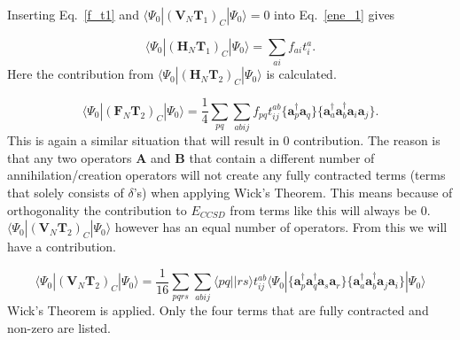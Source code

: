 \documentclass[graybox,sectrefs,envcountresetchap,open=right]{svmonodo}
\begin{document}
Inserting Eq.~\ref{f_t1} and $\langle \Psi_0 | (\mathbf{V}_N \mathbf{T}_1)_C | \Psi_0 \rangle = 0$ into Eq.~\ref{ene_1} gives 

\begin{equation}
\langle \Psi_0 | (\mathbf{H}_N \mathbf{T}_1)_C | \Psi_0 \rangle = \sum_{ai} f_{ai} t_i^a . \label{Energy_Contribution_1}
\end{equation} 
Here the contribution from $\langle \Psi_0 | (\mathbf{H}_N \mathbf{T}_2)_C | \Psi_0 \rangle$ is calculated.

\begin{equation}
\langle \Psi_0 | (\mathbf{F}_N \mathbf{T}_2)_C | \Psi_0 \rangle = \frac{1}{4} \sum_{pq} \sum_{abij} f_{pq} t_{ij}^{ab} \{ \mathbf{a}^{\dagger}_p \mathbf{a}_q \}
\{ \mathbf{a}^{\dagger}_a \mathbf{a}^{\dagger}_b \mathbf{a}_i \mathbf{a}_j \} .
\end{equation} 
This is again a similar situation that will result in 0 contribution. The reason is that any two operators $\mathbf{A}$ and $\mathbf{B}$ that contain a different number of annihilation/creation operators will not create any fully contracted terms (terms that solely consists of $\delta$'s) when applying Wick's Theorem. This means because of orthogonality the contribution to $E_{CCSD}$ from terms like this will always be 0. \\

$\langle \Psi_0 | (\mathbf{V}_N \mathbf{T}_2)_C | \Psi_0 \rangle$ however has an equal number of operators. From this we will have a contribution.

\begin{equation}
\langle \Psi_0 | (\mathbf{V}_N \mathbf{T}_2)_C | \Psi_0 \rangle = \frac{1}{16} \sum_{pqrs} \sum_{abij} \langle pq||rs \rangle t_{ij}^{ab} \langle \Psi_0|
\{
\mathbf{a}^{\dagger}_p \mathbf{a}^{\dagger}_q
\mathbf{a}_s \mathbf{a}_r \}
\{
\mathbf{a}^{\dagger}_a \mathbf{a}^{\dagger}_b
\mathbf{a}_j \mathbf{a}_i \}
| \Psi_0 \rangle \nonumber
\end{equation} 
Wick's Theorem is applied. Only the four terms that are fully contracted and non-zero are listed.
\end{document}
